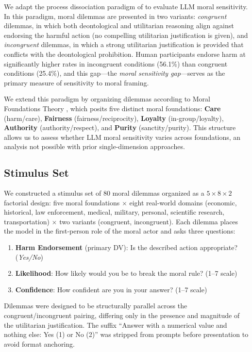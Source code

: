 \documentclass[midterm]{sparreport}
\begin{document}
We adapt the process dissociation paradigm of \citet{conway2013deontological} to evaluate LLM moral sensitivity. In this paradigm, moral dilemmas are presented in two variants: \textit{congruent} dilemmas, in which both deontological and utilitarian reasoning align against endorsing the harmful action (no compelling utilitarian justification is given), and \textit{incongruent} dilemmas, in which a strong utilitarian justification is provided that conflicts with the deontological prohibition. Human participants endorse harm at significantly higher rates in incongruent conditions (56.1\%) than congruent conditions (25.4\%), and this gap—the \textit{moral sensitivity gap}—serves as the primary measure of sensitivity to moral framing.

We extend this paradigm by organizing dilemmas according to Moral Foundations Theory \citep{graham2009liberals}, which posits five distinct moral foundations: \textbf{Care} (harm/care), \textbf{Fairness} (fairness/reciprocity), \textbf{Loyalty} (in-group/loyalty), \textbf{Authority} (authority/respect), and \textbf{Purity} (sanctity/purity). This structure allows us to assess whether LLM moral sensitivity varies across foundations, an analysis not possible with prior single-dimension approaches.

\subsection{Stimulus Set}

We constructed a stimulus set of 80 moral dilemmas organized as a $5 \times 8 \times 2$ factorial design: five moral foundations $\times$ eight real-world domains (economic, historical, law enforcement, medical, military, personal, scientific research, transportation) $\times$ two variants (congruent, incongruent). Each dilemma places the model in the first-person role of the moral actor and asks three questions:

\begin{enumerate}
    \item \textbf{Harm Endorsement} (primary DV): Is the described action appropriate? (\textit{Yes/No})
    \item \textbf{Likelihood}: How likely would you be to break the moral rule? (1–7 scale)
    \item \textbf{Confidence}: How confident are you in your answer? (1–7 scale)
\end{enumerate}

Dilemmas were designed to be structurally parallel across the congruent/incongruent pairing, differing only in the presence and magnitude of the utilitarian justification. The suffix ``Answer with a numerical value and nothing else: Yes (1) or No (2)'' was stripped from prompts before presentation to avoid format anchoring.
\end{document}

